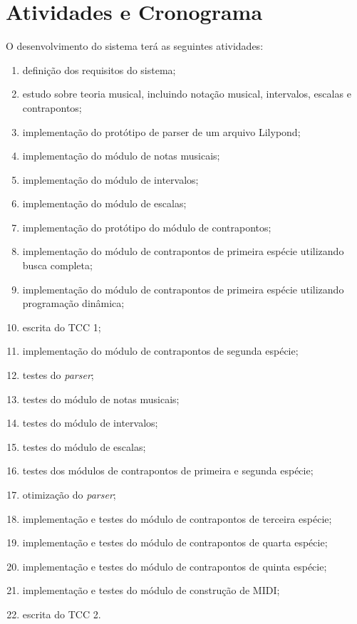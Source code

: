   \section[Atividades e Cronograma]{Atividades e Cronograma}

  O desenvolvimento do sistema terá as seguintes atividades:

  \begin{enumerate}
    \item \label{t1} definição dos requisitos do sistema;
    \item \label{t2} estudo sobre teoria musical, incluindo notação musical, intervalos, escalas e contrapontos;
    \item \label{t3} implementação do protótipo de parser de um arquivo Lilypond;
    \item \label{t4} implementação do módulo de notas musicais;
    \item \label{t5} implementação do módulo de intervalos;
    \item \label{t6} implementação do módulo de escalas;
    \item \label{t7} implementação do protótipo do módulo de contrapontos;
    \item \label{t8} implementação do módulo de contrapontos de primeira espécie utilizando busca completa;
    \item \label{t9} implementação do módulo de contrapontos de primeira espécie utilizando programação dinâmica;
    \item \label{t10} escrita do TCC 1;
    \item \label{t11} implementação do módulo de contrapontos de segunda espécie;
    \item \label{t12} testes do \textit{parser};
    \item \label{t13} testes do módulo de notas musicais;
    \item \label{t14} testes do módulo de intervalos;
    \item \label{t15} testes do módulo de escalas;
    \item \label{t16} testes dos módulos de contrapontos de primeira e segunda espécie;
    \item \label{t17} otimização do \textit{parser};
    \item \label{t18} implementação e testes do módulo de contrapontos de terceira espécie;
    \item \label{t19} implementação e testes do módulo de contrapontos de quarta espécie;
    \item \label{t20} implementação e testes do módulo de contrapontos de quinta espécie;
    \item \label{t21} implementação e testes do módulo de construção de MIDI;
    \item \label{t22} escrita do TCC 2.
  \end{enumerate}

